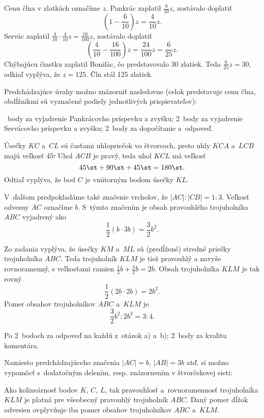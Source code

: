 {%
Cenu člna v zlatkách označíme $z$.
Pankrác zaplatil $\frac6{10}z$, zostávalo doplatiť
$$
\left (1-\frac6{10} \right)z =\frac4{10}z .
$$
Servác zaplatil $\frac4{10}\cdot\frac4{10}z = \frac{16}{100}z$, zostávalo doplatiť
$$
\left( \frac4{10}-\frac{16}{100} \right) z = \frac{24}{100}z =  \frac{6}{25}z .
$$
Chýbajúcu čiastku zaplatil Bonifác, čo predstavovalo 30 zlatiek.
Teda $\frac{6}{25}z =30$, odkiaľ vyplýva, že $z=125$.
Čln stál 125 zlatiek.

\poznamka
Predchádzajúce úvahy možno znázorniť nasledovne (celok predstavuje cenu člna, obdĺžnikmi sú vyznačené podiely jednotlivých prispievateľov):
%

~body za vyjadrenie Pankrácovho príspevku a zvyšku;
2~body za vyjadrenie Servácovho príspevku a zvyšku;
2~body za dopočítanie a~odpoveď.
\endhodnotenie
}

{%
Úsečky $KC$ a~$CL$ sú časťami uhlopriečok vo štvorcoch, preto uhly $KCA$ a~$LCB$ majú veľkosť 45\st.
Uhol $ACB$ je pravý, teda uhol $KCL$ má veľkosť
$$
45\st+90\st+45\st=180\st .
$$
Odtiaľ vyplýva, že bod $C$ je vnútorným bodom úsečky $KL$.
%

V~ďalšom predpokladáme také značenie vrcholov, že $|AC|:|CB|=1:3$.
Veľkosť odvesny $AC$ označíme $b$.
S~týmto značením je obsah pravouhlého trojuholníka $ABC$ vyjadrený ako
$$
\frac12(b\cdot3b)=\frac32 b^2 .
$$

Zo zadania vyplýva, že úsečky $KM$ a~$ML$ sú (predĺžené) stredné priečky trojuholníka $ABC$.
Teda trojuholník $KLM$ je tiež pravouhlý a navyše rovnoramenný, s veľkosťami ramien $\frac12b+\frac32b=2b$.
Obsah trojuholníka $KLM$ je tak rovný
$$
\frac12(2b\cdot2b) =2b^2.
$$
Pomer obsahov trojuholníkov $ABC$ a~$KLM$ je
$$
\frac32 b^2 : 2b^2 = 3 : 4 .
$$
%

\hodnotenie
Po 2~bodoch za odpoveď na každú z~otázok a) a~b);
2~body za kvalitu komentára.

\poznamky
Namiesto predchádzajúceho značenia $|AC|=b$, $|AB|=3b$ atď. si možno vypomôcť s~dodatočným delením, resp. znázornením v štvorčekovej sieti:
%

Ako kolineárnosť bodov $K$, $C$, $L$, tak pravouhlosť a~rovnoramennosť trojuholníka $KLM$ je platná pre všeobecný pravouhlý trojuholník $ABC$.
Daný pomer dĺžok odvesien ovplyvňuje iba pomer obsahov trojuholníkov $ABC$ a~$KLM$.

\endhodnotenie
}

